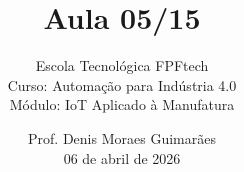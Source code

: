 \title{Aula 05/15}

\subtitle{
\vspace{1.0cm}
Escola Tecnológica FPFtech\\
\vspace{0.5cm}
Curso: Automação para Indústria 4.0\\
\vspace{0.5cm}
Módulo: IoT Aplicado à Manufatura
\vspace{1.0cm}
}

\author{
Prof. Denis Moraes Guimarães\\
\small 06 de abril de 2026
}

\date{}